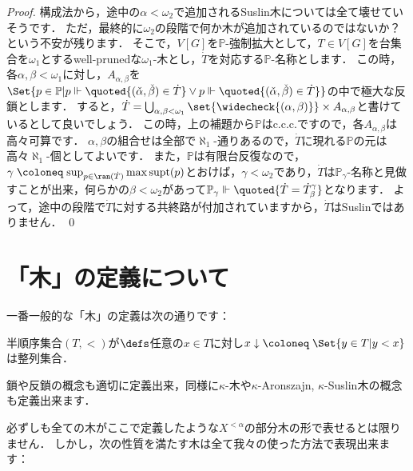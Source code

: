 \documentclass[a4j]{ltjsarticle}
\renewcommand{\defeq}{\mathrel{\coloneq}}
\renewcommand{\emph}[1]{\textsf{\textgt{#1}}}
\begin{document}
\begin{proof}
 構成法から，途中の$\alpha < \omega_2$で追加されるSuslin木については全て壊せていそうです．
 ただ，最終的に$\omega_2$の段階で何か木が追加されているのではないか？という不安が残ります．
 そこで，$V[G]$を$\mathbb{P}$-強制拡大として，$T \in V[G]$を台集合を$\omega_1$とするwell-prunedな$\omega_1$-木とし，$\dot{T}$を対応する$\mathbb{P}$-名称とします．
 この時，各$\alpha, \beta < \omega_1$に対し，$A_{\alpha,\beta}$を$\Set{p \in \mathbb{P} | p \Vdash \quoted{(\check{\alpha}, \check{\beta}) \in \dot{T}} \lor p \Vdash \quoted{(\check{\alpha}, \check{\beta}) \in \dot{T}}}$の中で極大な反鎖とします．
 すると，$\dot{T} = \bigcup_{\alpha, \beta < \omega_1} \set{\widecheck{(\alpha, \beta)}} \times A_{\alpha,\beta}$と書けているとして良いでしょう．
 この時，上の補題から$\mathbb{P}$はc.c.c.ですので，各$A_{\alpha,\beta}$は高々可算です．
 $\alpha, \beta$の組合せは全部で$\aleph_1$-通りあるので，$\dot{T}$に現れる$\mathbb{P}$の元は高々$\aleph_1$-個としてよいです．
 また，$\mathbb{P}$は有限台反復なので，$\gamma \defeq \sup_{p \in \ran(\dot{T})} \max \mathop{\mathrm{supt}}(p)$とおけば，$\gamma < \omega_2$であり，$\dot{T}$は$\mathbb{P}_\gamma$-名称と見做すことが出来，何らかの$\beta < \omega_2$があって$\mathbb{P}_\gamma \Vdash \quoted{\dot{T} = \dot{T}^\gamma_\beta}$となります．
 よって，途中の段階で$\dot{T}$に対する共終路が付加されていますから，$\dot{T}$はSuslinではありません． \qed
\end{proof}

\section*{「木」の定義について}
一番一般的な「木」の定義は次の通りです：
\begin{definition}
 半順序集合$(T, <)$が\emph{木}$\defs$任意の$x \in T$に対し$\mathord{x\downarrow} \defeq \Set{y \in T | y < x}$は整列集合．
\end{definition}

鎖や反鎖の概念も適切に定義出来，同様に$\kappa$-木や$\kappa$-Aronszajn, $\kappa$-Suslin木の概念も定義出来ます．

必ずしも全ての木がここで定義したような$X^{<\alpha}$の部分木の形で表せるとは限りません．
しかし，次の性質を満たす木は全て我々の使った方法で表現出来ます：
\end{document}

